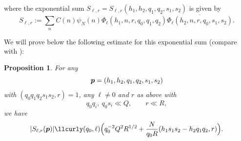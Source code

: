 \documentclass[12pt,a4paper,reqno]{amsart}
\numberwithin{equation}{section}
\theoremstyle{plain}
\newtheorem{proposition}[theorem]{Proposition}
\theoremstyle{definition}
\newcommand\eps{\varepsilon}
\newcommand{\uple}[1]{\text{\boldmath${#1}$}}
\def\stacksum#1#2{{\stackrel{{\scriptstyle #1}}
{{\scriptstyle #2}}}}
\newcommand\sumsum{\mathop{\sum\sum}\limits}
\renewcommand{\sim}{\asymp}
\renewcommand{\lessapprox}{\llcurly}
\begin{document}
where the exponential sum  $S_{\ell,r}=S_{\ell,r}(h_1,h_2,q_1,q_2,s_1,s_2)$ is given by
\begin{equation}\label{S-def}
  S_{\ell,r}:=  \sum_n C(n)\psi_N(n) \Phi_{\ell}(h_1,n, r, q_0,q_1,q_2)
  \overline{\Phi_{\ell}( h_2,n, r,q_0,s_1,s_2)}.
\end{equation}

We will prove below the following estimate for this exponential sum
(compare with \cite[(12.5)]{zhang}):

\begin{proposition}\label{exse} For any
$$
\uple{p}=(h_1,h_2,q_1,q_2,s_1,s_2)
$$
with $(q_0q_1q_2s_1s_2,r)=1$, any $\ell \neq 0$ and $r$ as above with
$$
q_0q_i,\ q_0s_i\ll Q,\quad\quad r\ll R,
$$
we have
$$ 
|S_{\ell,r}(\uple{p})| \lessapprox (q_0,\ell)\Bigl( q_0^{-2} Q^2
R^{1/2} + \frac{N}{q_0R} (h_1s_1s_2-h_2q_1q_2,r)\Bigr).
$$
\end{proposition}
\end{document}
